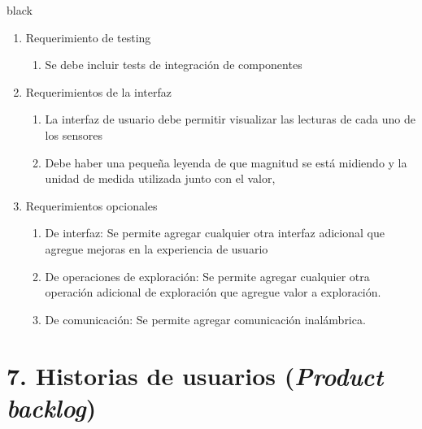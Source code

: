 \documentclass[
11pt, %
codirector, %
]{charter}
\begin{document}
\begin{consigna}{black}
\begin{enumerate}
\begin{enumerate}
		\end{enumerate}	
	\item Requerimiento de testing		
		\begin{enumerate}			
			\item Se debe incluir tests de integración de componentes		
		\end{enumerate}	
	\item Requerimientos de la interfaz		
		\begin{enumerate}			
			\item La interfaz de usuario debe permitir visualizar las lecturas de cada uno de los sensores			
			\item Debe haber una pequeña leyenda de que magnitud se está midiendo y la unidad de medida utilizada junto con el valor,		
		\end{enumerate}	
	\item Requerimientos opcionales		
		\begin{enumerate}			
			\item De interfaz: Se permite agregar cualquier otra interfaz adicional que agregue mejoras en la experiencia de usuario			
			\item De operaciones de exploración: Se permite agregar cualquier otra operación adicional de exploración que agregue valor a exploración.			
			\item De comunicación: Se permite agregar comunicación inalámbrica.		
	\end{enumerate}
\end{enumerate}




\end{consigna}

\section{7. Historias de usuarios (\textit{Product backlog})}
\label{sec:backlog}
\end{document}
